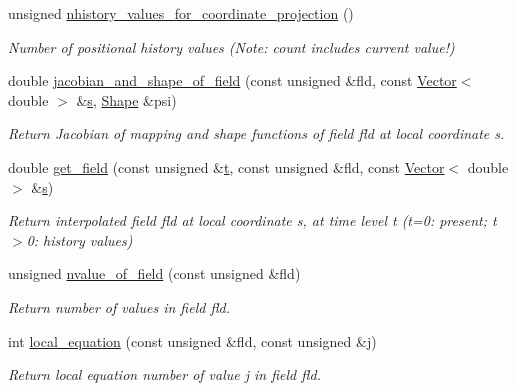 \begin{DoxyCompactItemize}
unsigned \hyperlink{classoomph_1_1ProjectableGeneralisedNewtonianTaylorHoodElement_a126d79b6d873a2e4e73ea300089cef85}{nhistory\+\_\+values\+\_\+for\+\_\+coordinate\+\_\+projection} ()
\begin{DoxyCompactList}\small\item\em Number of positional history values (Note\+: count includes current value!) \end{DoxyCompactList}\item 
double \hyperlink{classoomph_1_1ProjectableGeneralisedNewtonianTaylorHoodElement_a14569ba6c03489a0ad3cee644794ee2e}{jacobian\+\_\+and\+\_\+shape\+\_\+of\+\_\+field} (const unsigned \&fld, const \hyperlink{classoomph_1_1Vector}{Vector}$<$ double $>$ \&\hyperlink{cfortran_8h_ab7123126e4885ef647dd9c6e3807a21c}{s}, \hyperlink{classoomph_1_1Shape}{Shape} \&psi)
\begin{DoxyCompactList}\small\item\em Return Jacobian of mapping and shape functions of field fld at local coordinate s. \end{DoxyCompactList}\item 
double \hyperlink{classoomph_1_1ProjectableGeneralisedNewtonianTaylorHoodElement_aa43386b75da4ae4c4b1dd89d335de0db}{get\+\_\+field} (const unsigned \&\hyperlink{cfortran_8h_af6f0bd3dc13317f895c91323c25c2b8f}{t}, const unsigned \&fld, const \hyperlink{classoomph_1_1Vector}{Vector}$<$ double $>$ \&\hyperlink{cfortran_8h_ab7123126e4885ef647dd9c6e3807a21c}{s})
\begin{DoxyCompactList}\small\item\em Return interpolated field fld at local coordinate s, at time level t (t=0\+: present; t$>$0\+: history values) \end{DoxyCompactList}\item 
unsigned \hyperlink{classoomph_1_1ProjectableGeneralisedNewtonianTaylorHoodElement_a44ae0637efb48b6dc0c2f886bf39e376}{nvalue\+\_\+of\+\_\+field} (const unsigned \&fld)
\begin{DoxyCompactList}\small\item\em Return number of values in field fld. \end{DoxyCompactList}\item 
int \hyperlink{classoomph_1_1ProjectableGeneralisedNewtonianTaylorHoodElement_aade79476ead53af48e508562033bfb50}{local\+\_\+equation} (const unsigned \&fld, const unsigned \&j)
\begin{DoxyCompactList}\small\item\em Return local equation number of value j in field fld. \end{DoxyCompactList}\end{DoxyCompactItemize}
